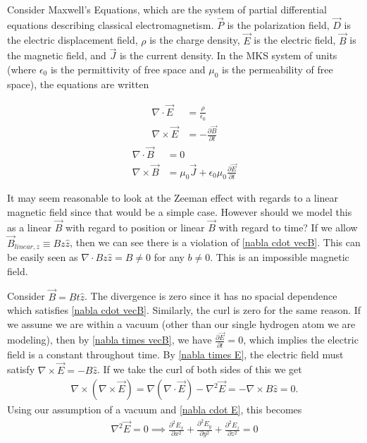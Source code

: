 Consider Maxwell's Equations, which are the system of partial differential equations describing classical electromagnetism. $\vec{P}$ is the polarization field, $\vec{D}$ is the electric displacement field, $\rho$ is the charge density, $\vec{E}$ is the electric field, $\vec{B}$ is the magnetic field, and $\vec{J}$ is the current density. In the MKS system of units (where $\epsilon_0$ is the permittivity of free space and $\mu_0$ is the permeability of free space), the equations are written 
\begin{multicols}{2}
	\noindent
	\begin{align}
		\nabla \cdot \vec{E} &= \frac{\rho}{\epsilon_0} \label{nabla cdot E}\\
		\nabla \times \vec{E} &= -\frac{\partial \vec{B}}{\partial t} \label{nabla times E}
	\end{align}
	\begin{align}
		\nabla \cdot \vec{B} &= 0  \label{nabla cdot vecB}\\
		\nabla \times \vec{B} &= \mu_0\vec{J}+\epsilon_0\mu_0\frac{\partial \vec{E}}{\partial t} \label{nabla times vecB}
	\end{align}
\end{multicols}
It may seem reasonable to look at the Zeeman effect with regards to a linear magnetic field since that would be a simple case. However should we model this as a linear $\vec{B}$ with regard to position or linear $\vec{B}$ with regard to time? If we allow $\vec{B}_{linear, z} \equiv B z \hat{z}$, then we can see there is a violation of \ref{nabla cdot vecB}. This can be easily seen as $\nabla \cdot B z \hat{z} = B \neq 0$ for any $b\neq 0$. This is an impossible magnetic field. 

Consider $\vec{B} = Bt \hat{z}$. The divergence is zero since it has no spacial dependence which satisfies \ref{nabla cdot vecB}. Similarly, the curl is zero for the same reason. If we assume we are within a vacuum (other than our single hydrogen atom we are modeling), then by \ref{nabla times vecB}, we have $\frac{\partial \vec{E}}{\partial t} = 0$, which implies the electric field is a constant throughout time. By \ref{nabla times E}, the electric field must satisfy $\nabla \times \vec{E} = -B \hat{z}$. If we take the curl of both sides of this we get
\begin{align}
	\nabla \times(\nabla \times \vec{E}) = \nabla (\nabla \cdot \vec{E})- \nabla^2 \vec{E} = -\nabla \times B \hat{z} =0.
\end{align}
Using our assumption of a vacuum and \ref{nabla cdot E}, this becomes 
\begin{align}
	\nabla^2 \vec{E} =  0 \implies \frac{\partial^2 E_x}{\partial x^2}+\frac{\partial^2 E_y}{\partial y^2}+\frac{\partial^2 E_z}{\partial z^2}=0 \label{del^2 E=0}
\end{align}

